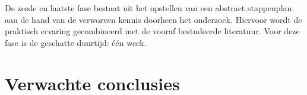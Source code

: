 \documentclass{hogent-article}
\begin{document}
De zesde en laatste fase bestaat uit het opstellen van een abstract stappenplan aan de hand van de verworven kennis doorheen het onderzoek. Hiervoor wordt de praktisch ervaring gecombineerd met de vooraf bestudeerde literatuur. Voor deze fase is de geschatte duurtijd: \'e\'en week.


\section{Verwachte conclusies}


\lipsum[14-18]


\printbibliography[heading=bibintoc]
\end{document}
